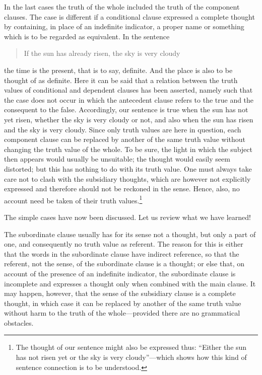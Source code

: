 \documentclass[twoside,12pt,a4paper]{article}
\begin{document}
In the last cases the truth of the whole included the truth of the
component clauses. The case is different if a conditional clause
expressed a complete thought by containing, in place of an indefinite
indicator, a proper name or something which is to be regarded as
equivalent. In the sentence

\begin{quote}
  If the sun has already risen, the sky is very cloudy
\end{quote}

\noindent the time is the present, that is to say, definite. And the
place is also to be thought of as definite. Here it can be said that a
relation between the truth values of conditional and dependent clauses
has been asserted, namely such that the case does not occur in which
the antecedent clause refers to the true and the consequent to the
false. Accordingly, our sentence is true when the sun has not yet
risen, whether the sky is very cloudy or not, and also when the sun
has risen and the sky is very cloudy. Since only truth values are here
in question, each component clause can be replaced by another of the
same truth value without changing the truth value of the whole. To be
sure, the light in which the subject then appears would usually be
unsuitable; the  thought would easily seem distorted;
but this has nothing to do with its truth value. One must always take
care not to clash with the subsidiary thoughts, which are however not
explicitly expressed and therefore should not be reckoned in the
sense. Hence, also, no account need be taken of their truth
values.\footnote[13]{The thought of our sentence might also be
  expressed thus: ``Either the sun has not risen yet or the sky is
  very cloudy''---which shows how this kind of sentence connection is to
  be understood.}

The simple cases have now been discussed. Let us review what we have
learned!

The subordinate clause usually has for its sense not a thought, but
only a part of one, and consequently no truth value as referent. The
reason for this is either that the words in the subordinate clause
have indirect reference, so that the referent, not the sense, of the
subordinate clause is a thought; or else that, on account of the
presence of an indefinite indicator, the subordinate clause is
incomplete and expresses a thought only when combined with the main
clause. It may happen, however, that the sense of the subsidiary
clause is a complete thought, in which case it can be replaced by
another of the same truth value without harm to the truth of the
whole---provided there are no grammatical obstacles.
\end{document}

